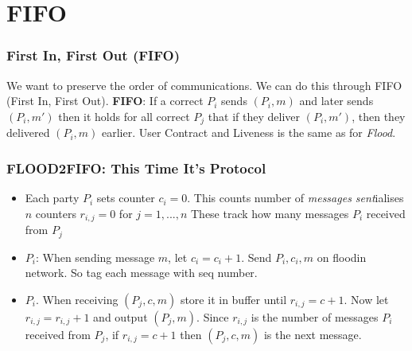 \documentclass[14pt]{beamer}
\begin{document}
\section{FIFO}
    \begin{frame}
        \frametitle{First In, First Out (FIFO)}
            We want to preserve the order of communications. We can do this through FIFO (First In, First Out). 
            \textbf{FIFO}: If a correct $P_i$ sends $(P_i, m)$ and later sends $(P_i, m')$ then it holds for all correct $P_j$ that if they deliver $(P_i, m')$, then they delivered $(P_i, m)$ earlier. 
            User Contract and Liveness is the same as for \textit{Flood}. 
    \end{frame}
    \begin{frame}
        \frametitle{FLOOD2FIFO: This Time It's Protocol}
            \begin{itemize}
                \item Each party $P_i$ sets counter $c_i = 0$. This counts number of \textit{messages sent}ialises $n$ counters $r_{i, j} = 0$ for $j = 1, ..., n$ These track how many messages $P_i$ received from $P_j$
                \item $P_i$: When sending message $m$, let $c_i = c_i + 1$. Send $P_i, c_i, m$ on floodin network. So tag each message with seq number.
                \item $P_i$. When receiving $(P_j, c, m)$ store it in buffer until $r_{i, j} = c + 1$. Now let $r_{i, j} = r_{i, j} + 1$ and output $(P_j, m)$. Since $r_{i, j}$ is the number of messages $P_i$ received from $P_j$, if $r_{i, j} = c + 1$ then $(P_j, c, m)$ is the next message. 
            \end{itemize}
    \end{frame}


\end{document}
